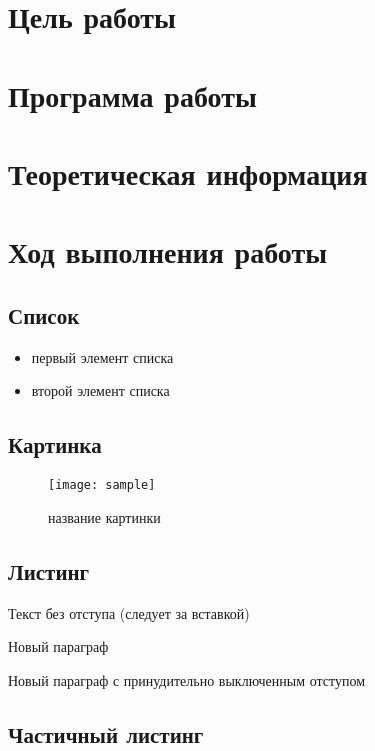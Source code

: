




\section{Цель работы}
\section{Программа работы}
\section{Теоретическая информация}
\section{Ход выполнения работы}
\subsection{Список}

\begin{itemize}
\item первый элемент списка
\item второй элемент списка
\end{itemize}

\subsection{Картинка}

\begin{figure}[H]
	\begin{center}
		\texttt{[image: sample]}
		\caption{название картинки} 
		\label{pic:pic_name} 
	\end{center}
\end{figure}

\subsection{Листинг}


\parindent=1cm %
Текст без отступа (следует за вставкой)

Новый параграф

\noindent Новый параграф с принудительно выключенным отступом


\subsection{Частичный листинг}
\makeatletter
\def\lst@PlaceNumber{\llap{\normalfont
                \lst@numberstyle{\the\lst@lineno}\kern\lst@numbersep}}
\makeatother

